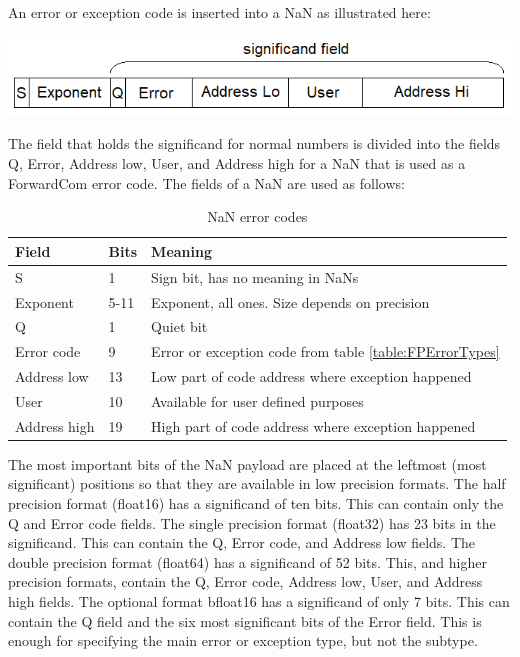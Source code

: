 \documentclass[forwardcom.tex]{subfiles}
\begin{document}
An error or exception code is inserted into a NaN as illustrated here:
\vv

\includegraphics[width=450pt]{nan_code.png}
\vv

The field that holds the significand for normal numbers is divided into the fields Q, Error, Address low, User, and Address high for a NaN that is used as a ForwardCom error code. The fields of a NaN are used as follows:

\begin{longtable}
{|p{25mm}|p{15mm}|p{100mm}|}
\caption{NaN error codes}
\label{table:NaNErrorCode}
\endfirsthead
\endhead
\hline
\bfseries Field & \bfseries Bits & \bfseries Meaning \\ \hline
S    & 1 & Sign bit, has no meaning in NaNs \\
\hline
Exponent & 5-11 & Exponent, all ones. Size depends on precision \\
\hline
Q    & 1 & Quiet bit \\
\hline
Error code & 9 & Error or exception code from table \ref{table:FPErrorTypes} \\
\hline
Address low & 13 & Low part of code address where exception happened \\
\hline
User    & 10 & Available for user defined purposes \\
\hline
Address high & 19 & High part of code address where exception happened \\
\hline
\end{longtable}
\vv

The most important bits of the NaN payload are placed at the leftmost (most significant) positions so that they are available in low precision formats.
The half precision format (float16) has a significand of ten bits. This can contain only the Q and Error code fields. The single precision format (float32) has 23 bits in the significand. This can contain the Q, Error code, and Address low fields. The double precision format (float64) has a significand of 52 bits. This, and higher precision formats, contain the Q, Error code, Address low, User, and Address high fields. The optional format bfloat16 has a significand of only 7 bits. This can contain the Q field and the six most significant bits of the Error field. This is enough for specifying the main error or exception type, but not the subtype.
\vv
\end{document}
